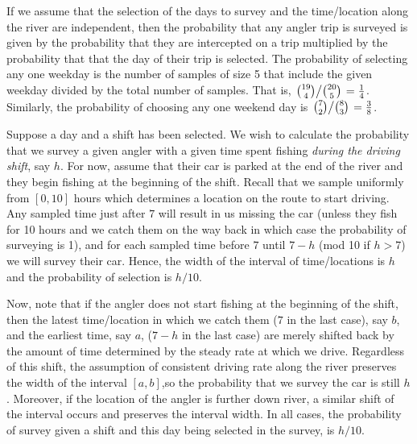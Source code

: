 \documentclass{homework}
\begin{document}
\begin{solution}
  If we assume that the selection of the days to survey and the time/location along the
  river are independent, then the probability that any angler trip is surveyed
  is given by the probability that they are intercepted on a trip multiplied by
  the probability that that the day of their trip is selected.  The probability
  of selecting any one weekday is the number of samples of size 5 that include
  the given weekday divided by the total number of samples.  That is,  
  $\left.\binom{19}4 \middle / \binom{20}5\right. = \frac 14$.  
  Similarly, the probability of choosing any one weekend day is 
  $\left. \binom 72 \middle/\binom 83\right. =\frac 38$. 

  Suppose a day and a shift has been selected. We wish to calculate the
  probability that we survey a given angler with a given time spent fishing
  \emph{during the driving shift}, say $h$.
  For now, assume that their car is parked at the end of the river and they
  begin fishing at the beginning of the shift.  Recall that we sample uniformly
  from $[0,10]$ hours which determines a location on the route to start
  driving.  Any sampled time just after $7$ will result in us missing the car
  (unless they fish for 10 hours and we catch them on the way back in which
  case the probability of surveying is 1), and for each sampled time before $7$
  until $7-h$ (mod 10 if $h>7$) we will survey their car. Hence, the width of the
  interval of time/locations is $h$ and the probability of selection is $h/10$.

  Now, note that if the angler does not start fishing at the beginning of the
  shift, then the latest time/location in which we catch them ($7$ in the last
  case), say $b$, and the earliest time, say $a$, ($7-h$ in the last case) are
  merely shifted back by the amount of time determined by the steady rate at
  which we drive.  Regardless of this shift, the assumption of  consistent
  driving rate along the river preserves the width of the interval $[a,b]$,so the 
  probability that  we survey the car is still $h$.  Moreover, if the location of the angler is
  further down river, a similar shift of the interval occurs and preserves the
  interval width.  In all cases, the probability of survey given a shift
  and this day being selected in the survey, is $h/10$.


\end{solution}
\end{document}

